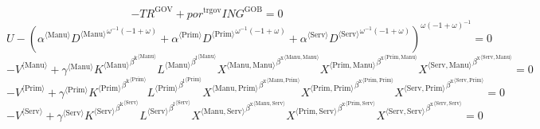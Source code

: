 \begin{equation}
-{T\!R}^{\mathrm{GOV}} + {{p\!o\!r}^{\mathrm{trgov}}} {{I\!N\!G}^{\mathrm{GOB}}} = 0
\end{equation}
\begin{equation}
U - \left({{\alpha}^{\langle \mathrm{\mathrm{Manu}}\rangle}} {{{D}^{\langle \mathrm{Manu}\rangle}}^{{\omega}^{-1} \left(-1 + \omega\right)}} + {{\alpha}^{\langle \mathrm{\mathrm{Prim}}\rangle}} {{{D}^{\langle \mathrm{Prim}\rangle}}^{{\omega}^{-1} \left(-1 + \omega\right)}} + {{\alpha}^{\langle \mathrm{\mathrm{Serv}}\rangle}} {{{D}^{\langle \mathrm{Serv}\rangle}}^{{\omega}^{-1} \left(-1 + \omega\right)}}\right)^{{\omega} \left(-1 + \omega\right)^{-1}} = 0
\end{equation}
\begin{equation}
-{V}^{\langle \mathrm{Manu}\rangle} + {{\gamma}^{\langle \mathrm{\mathrm{Manu}}\rangle}} {{{K}^{\langle \mathrm{Manu}\rangle}}^{{\beta^{\mathrm{k}}}^{\langle \mathrm{\mathrm{Manu}}\rangle}}} {{{L}^{\langle \mathrm{Manu}\rangle}}^{{\beta^{\mathrm{l}}}^{\langle \mathrm{\mathrm{Manu}}\rangle}}} {{{X}^{\langle \mathrm{Manu},\mathrm{Manu}\rangle}}^{{\beta^{\mathrm{x}}}^{\langle \mathrm{\mathrm{Manu}},\mathrm{\mathrm{Manu}}\rangle}}} {{{X}^{\langle \mathrm{Prim},\mathrm{Manu}\rangle}}^{{\beta^{\mathrm{x}}}^{\langle \mathrm{\mathrm{Prim}},\mathrm{\mathrm{Manu}}\rangle}}} {{{X}^{\langle \mathrm{Serv},\mathrm{Manu}\rangle}}^{{\beta^{\mathrm{x}}}^{\langle \mathrm{\mathrm{Serv}},\mathrm{\mathrm{Manu}}\rangle}}} = 0
\end{equation}
\begin{equation}
-{V}^{\langle \mathrm{Prim}\rangle} + {{\gamma}^{\langle \mathrm{\mathrm{Prim}}\rangle}} {{{K}^{\langle \mathrm{Prim}\rangle}}^{{\beta^{\mathrm{k}}}^{\langle \mathrm{\mathrm{Prim}}\rangle}}} {{{L}^{\langle \mathrm{Prim}\rangle}}^{{\beta^{\mathrm{l}}}^{\langle \mathrm{\mathrm{Prim}}\rangle}}} {{{X}^{\langle \mathrm{Manu},\mathrm{Prim}\rangle}}^{{\beta^{\mathrm{x}}}^{\langle \mathrm{\mathrm{Manu}},\mathrm{\mathrm{Prim}}\rangle}}} {{{X}^{\langle \mathrm{Prim},\mathrm{Prim}\rangle}}^{{\beta^{\mathrm{x}}}^{\langle \mathrm{\mathrm{Prim}},\mathrm{\mathrm{Prim}}\rangle}}} {{{X}^{\langle \mathrm{Serv},\mathrm{Prim}\rangle}}^{{\beta^{\mathrm{x}}}^{\langle \mathrm{\mathrm{Serv}},\mathrm{\mathrm{Prim}}\rangle}}} = 0
\end{equation}
\begin{equation}
-{V}^{\langle \mathrm{Serv}\rangle} + {{\gamma}^{\langle \mathrm{\mathrm{Serv}}\rangle}} {{{K}^{\langle \mathrm{Serv}\rangle}}^{{\beta^{\mathrm{k}}}^{\langle \mathrm{\mathrm{Serv}}\rangle}}} {{{L}^{\langle \mathrm{Serv}\rangle}}^{{\beta^{\mathrm{l}}}^{\langle \mathrm{\mathrm{Serv}}\rangle}}} {{{X}^{\langle \mathrm{Manu},\mathrm{Serv}\rangle}}^{{\beta^{\mathrm{x}}}^{\langle \mathrm{\mathrm{Manu}},\mathrm{\mathrm{Serv}}\rangle}}} {{{X}^{\langle \mathrm{Prim},\mathrm{Serv}\rangle}}^{{\beta^{\mathrm{x}}}^{\langle \mathrm{\mathrm{Prim}},\mathrm{\mathrm{Serv}}\rangle}}} {{{X}^{\langle \mathrm{Serv},\mathrm{Serv}\rangle}}^{{\beta^{\mathrm{x}}}^{\langle \mathrm{\mathrm{Serv}},\mathrm{\mathrm{Serv}}\rangle}}} = 0
\end{equation}
